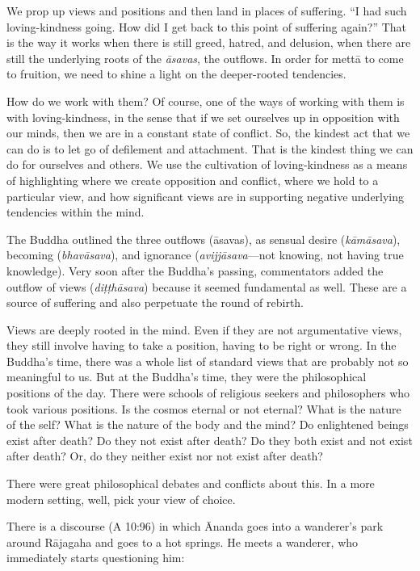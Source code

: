 We prop up views and positions and then land in places of suffering. “I
had such loving-kindness going. How did I get back to this point of
suffering again?” That is the way it works when there is still greed,
hatred, and delusion, when there are still the underlying roots of the
\emph{āsavas}, the outflows. In order for mettā to come to fruition, we
need to shine a light on the deeper-rooted tendencies.

How do we work with them? Of course, one of the ways of working with
them is with loving-kindness, in the sense that if we set ourselves up
in opposition with our minds, then we are in a constant state of
conflict. So, the kindest act that we can do is to let go of defilement
and attachment. That is the kindest thing we can do for ourselves and
others. We use the cultivation of loving-kindness as a means of
highlighting where we create opposition and conflict, where we hold to a
particular view, and how significant views are in supporting negative
underlying tendencies within the mind.

The Buddha outlined the three outflows (āsavas), as sensual desire
(\emph{kāmāsava}), becoming (\emph{bhavāsava}), and ignorance
(\emph{avijjāsava}—not knowing, not having true knowledge). Very soon
after the Buddha’s passing, commentators added the outflow of views
(\emph{diṭṭhāsava}) because it seemed fundamental as well. These are a
source of suffering and also perpetuate the round of rebirth.

Views are deeply rooted in the mind. Even if they are not argumentative
views, they still involve having to take a position, having to be right
or wrong. In the Buddha’s time, there was a whole list of standard views
that are probably not so meaningful to us. But at the Buddha’s time,
they were the philosophical positions of the day. There were schools of
religious seekers and philosophers who took various positions. Is the
cosmos eternal or not eternal? What is the nature of the self? What is
the nature of the body and the mind? Do enlightened beings exist after
death? Do they not exist after death? Do they both exist and not exist
after death? Or, do they neither exist nor not exist after death?

There were great philosophical debates and conflicts about this. In a
more modern setting, well, pick your view of choice.

There is a discourse (A 10:96) in which Ānanda goes into a wanderer’s
park around Rājagaha and goes to a hot springs. He meets a wanderer, who
immediately starts questioning him:

